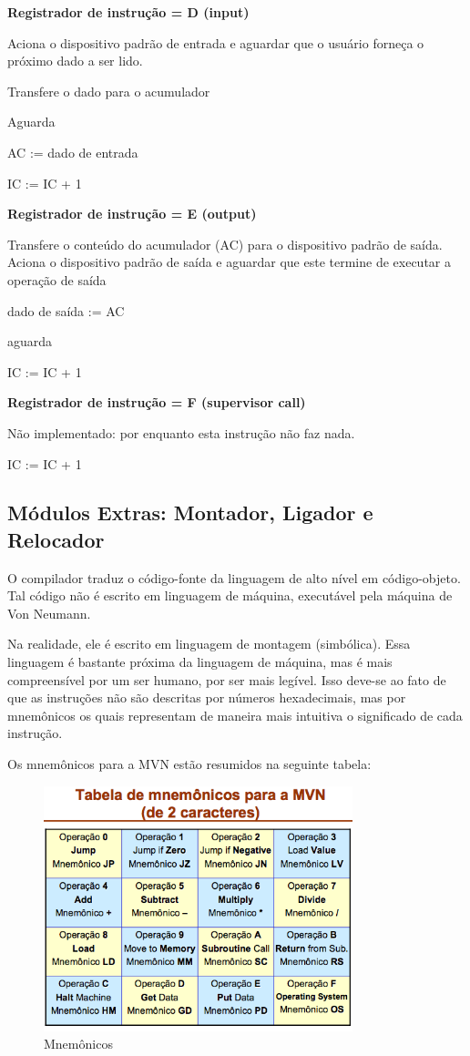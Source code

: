 \textbf{Registrador de instrução = D (input)}
 					

Aciona o dispositivo padrão de entrada e aguardar que o usuário forneça o próximo dado a ser lido.


Transfere o dado para o acumulador 


Aguarda


AC := dado de entrada 


IC := IC + 1 
		

\textbf{Registrador de instrução = E (output)}


Transfere o conteúdo do acumulador (AC) para o dispositivo padrão de saída.
Aciona o dispositivo padrão de saída e aguardar que este termine de executar a operação de saída 


dado de saída := AC 


aguarda


IC := IC + 1


\textbf{Registrador de instrução = F (supervisor call)}


Não implementado: por enquanto esta instrução não faz nada.


IC := IC + 1

\subsection{Módulos Extras: Montador, Ligador e Relocador}
  \label{chap:extras}

O compilador traduz o código-fonte da linguagem de alto nível em código-objeto. Tal código não é escrito em linguagem de máquina, executável pela máquina de Von Neumann. 


Na realidade, ele é escrito em linguagem de montagem (simbólica). Essa linguagem é bastante próxima da linguagem de máquina, mas é mais compreensível por um ser humano, por ser mais legível. Isso deve-se ao fato de que as instruções não são descritas por números hexadecimais, mas por mnemônicos os quais representam de maneira mais intuitiva o significado de cada instrução.


Os mnemônicos para a MVN estão resumidos na seguinte tabela:

\begin{figure}[H]
	\centering 
	\includegraphics[width=0.8\textwidth]{img/mnemonicos.png}  
	\caption{Mnemônicos}
	\label{fig:mnemonicos}
\end{figure}

